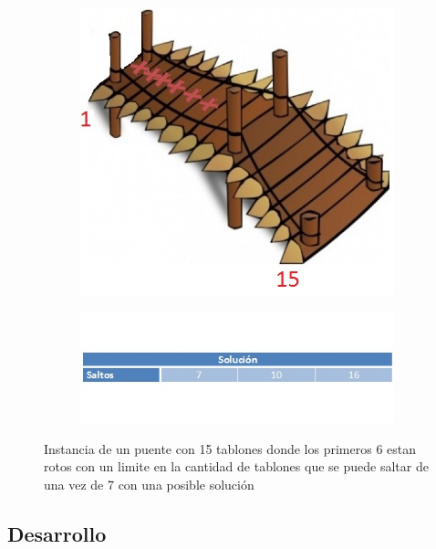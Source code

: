 \begin{figure}[H]
  \centering
		\begin{subfigure}[b]{0.3\textwidth}
                \includegraphics[scale=0.4]{Imagenes/Ej1/puenteIntro2}
                \caption{}
                \label{fig:intro}
        \end{subfigure} 
  		\begin{subfigure}[b]{0.3\textwidth}
               \includegraphics[scale=0.8]{Imagenes/Ej1/puenteSolu}
                \caption{}
                \label{fig:intro}
        \end{subfigure}
        \caption{Instancia de un puente con 15 tablones donde los primeros 6 estan rotos con un limite en la cantidad de tablones que se puede saltar de una vez de 7 con una posible solución} 
\end{figure}


\subsection{Desarrollo}

